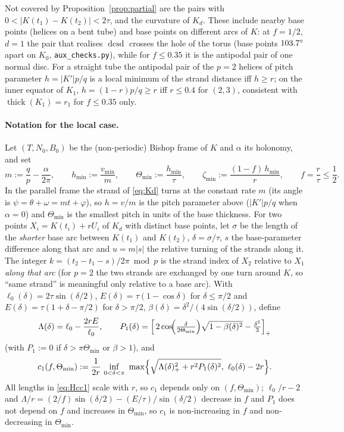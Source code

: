 \documentclass[10pt,a4paper]{article}
\theoremstyle{plain}
\theoremstyle{definition}
\theoremstyle{remark}
\newcommand{\thick}{\operatorname{thick}}
\newcommand{\dcsd}{\operatorname{dcsd}}
\begin{document}
Not covered by Proposition~\ref{prop:partial} are the pairs with $0<|K(t_1)-K(t_2)|<2\tau$, and the curvature of $K_d$. These include nearby base points (helices on a bent tube) and base points on different arcs of $K$: at $f=1/2$, $d=1$ the pair that realises $\dcsd$ crosses the hole of the torus (base points $103.7^\circ$ apart on $K_0$, \texttt{aux\_checks.py}), while for $f\le0.35$ it is the antipodal pair of one normal disc. For a straight tube the antipodal pair of the $p=2$ helices of pitch parameter $h=|K'|p/q$ is a local minimum of the strand distance iff $h\ge r$; on the inner equator of $K_1$, $h=(1-r)p/q\ge r$ iff $r\le0.4$ for $(2,3)$, consistent with $\thick(K_1)=r_1$ for $f\le0.35$ only.

\paragraph{Notation for the local case.} Let $(T,N_0,B_0)$ be the (non-periodic) Bishop frame of $K$ and $\alpha$ its holonomy, and set
\[
m:=\frac qp-\frac{\alpha}{2\pi},\qquad h_{\min}:=\frac{v_{\min}}{m},\qquad
\Theta_{\min}:=\frac{h_{\min}}{\tau},\qquad \zeta_{\min}:=\frac{(1-f)\,h_{\min}}{r},\qquad f=\frac r\tau\le\frac12 .
\]
In the parallel frame the strand of \eqref{eq:Kd} turns at the constant rate $m$ (its angle is $\psi=\theta+\omega=mt+\varphi$), so $h=v/m$ is the pitch parameter above ($|K'|p/q$ when $\alpha=0$) and $\Theta_{\min}$ is the smallest pitch in units of the base thickness. For two points $X_i=K(t_i)+rU_i$ of $K_d$ with distinct base points, let $\sigma$ be the length of the \emph{shorter} base arc between $K(t_1)$ and $K(t_2)$, $\delta=\sigma/\tau$, $s$ the base-parameter difference along that arc and $u=m|s|$ the relative turning of the strands along it. The integer $k=(t_2-t_1-s)/2\pi\bmod p$ is the strand index of $X_2$ relative to $X_1$ \emph{along that arc} (for $p=2$ the two strands are exchanged by one turn around $K$, so ``same strand'' is meaningful only relative to a base arc). With $\ell_0(\delta)=2\tau\sin(\delta/2)$, $E(\delta)=\tau(1-\cos\delta)$ for $\delta\le\pi/2$ and $E(\delta)=\tau(1+\delta-\pi/2)$ for $\delta>\pi/2$, $\beta(\delta)=\delta^2/(4\sin(\delta/2))$, define
\begin{equation}\label{eq:HcLP}
\Lambda(\delta)=\ell_0-\frac{2rE}{\ell_0},\qquad
P_1(\delta)=\Bigl[\,2\cos\!\Bigl(\tfrac{\delta}{2\Theta_{\min}}\Bigr)\sqrt{1-\beta(\delta)^2}-\tfrac{\delta^2}{3}\Bigr]_+
\end{equation}
(with $P_1:=0$ if $\delta>\pi\Theta_{\min}$ or $\beta>1$), and
\begin{equation}\label{eq:Hcc1}
c_1(f,\Theta_{\min}):=\frac1{2r}\,\inf_{0<\delta<\pi}\ \max\Bigl\{\sqrt{\Lambda(\delta)_+^2+r^2P_1(\delta)^2},\ \ell_0(\delta)-2r\Bigr\}.
\end{equation}
All lengths in \eqref{eq:Hcc1} scale with $r$, so $c_1$ depends only on $(f,\Theta_{\min})$; $\ell_0/r-2$ and $\Lambda/r=(2/f)\sin(\delta/2)-(E/\tau)/\sin(\delta/2)$ decrease in $f$ and $P_1$ does not depend on $f$ and increases in $\Theta_{\min}$, so $c_1$ is non-increasing in $f$ and non-decreasing in $\Theta_{\min}$.
\end{document}
